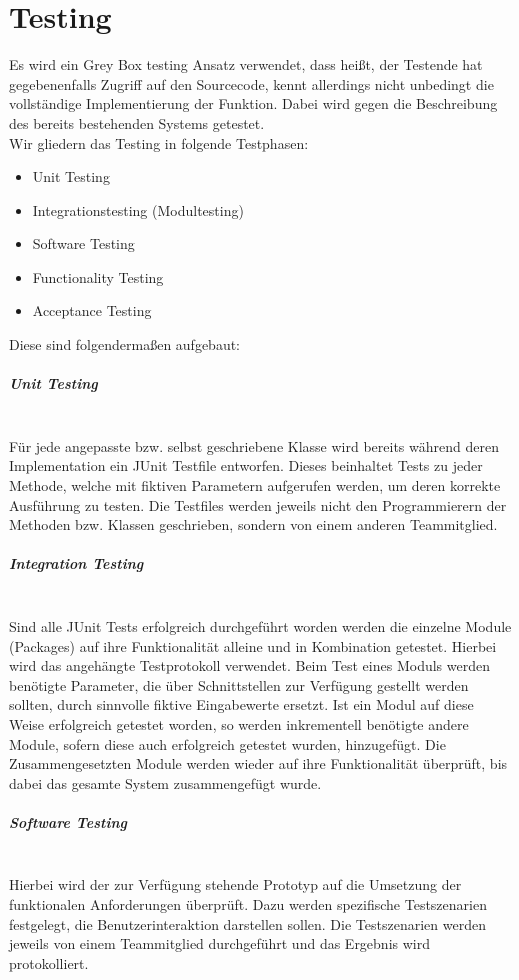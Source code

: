 \documentclass[10pt,a4paper]{article}
\begin{document}
\newpage
\section{Testing}
Es wird ein Grey Box testing Ansatz verwendet, dass heißt, der Testende hat gegebenenfalls Zugriff auf den Sourcecode, kennt allerdings nicht unbedingt die vollständige Implementierung der Funktion. Dabei wird gegen die Beschreibung des bereits bestehenden Systems getestet.\\
Wir gliedern das Testing in folgende Testphasen:
\begin{itemize}
\item Unit Testing
\item Integrationstesting (Modultesting)
\item Software Testing
\item Functionality Testing
\item Acceptance Testing
\end{itemize}
Diese sind folgendermaßen aufgebaut:
\subparagraph{Unit Testing}\ \\
Für jede angepasste bzw. selbst geschriebene Klasse wird bereits während deren Implementation ein JUnit Testfile entworfen. Dieses beinhaltet Tests zu jeder Methode, welche mit fiktiven Parametern aufgerufen werden, um deren korrekte Ausführung zu testen. Die Testfiles werden jeweils nicht den Programmierern der Methoden bzw. Klassen geschrieben, sondern von einem anderen Teammitglied. 

\subparagraph{Integration Testing}\ \\
Sind alle JUnit Tests erfolgreich durchgeführt worden werden die einzelne Module (Packages) auf ihre Funktionalität alleine und in Kombination getestet. Hierbei wird das angehängte Testprotokoll verwendet. Beim Test eines Moduls werden benötigte Parameter, die über Schnittstellen zur Verfügung gestellt werden sollten, durch sinnvolle fiktive Eingabewerte ersetzt. Ist ein Modul auf diese Weise erfolgreich getestet worden, so werden inkrementell benötigte andere Module, sofern diese auch erfolgreich getestet wurden, hinzugefügt. Die Zusammengesetzten Module werden wieder auf ihre Funktionalität überprüft, bis dabei das gesamte System zusammengefügt wurde.

\subparagraph{Software Testing}\ \\
Hierbei wird der zur Verfügung stehende Prototyp auf die Umsetzung der funktionalen Anforderungen überprüft. Dazu werden spezifische Testszenarien festgelegt, die Benutzerinteraktion darstellen sollen. Die Testszenarien werden jeweils von einem Teammitglied durchgeführt und das Ergebnis wird protokolliert. 
\end{document}
